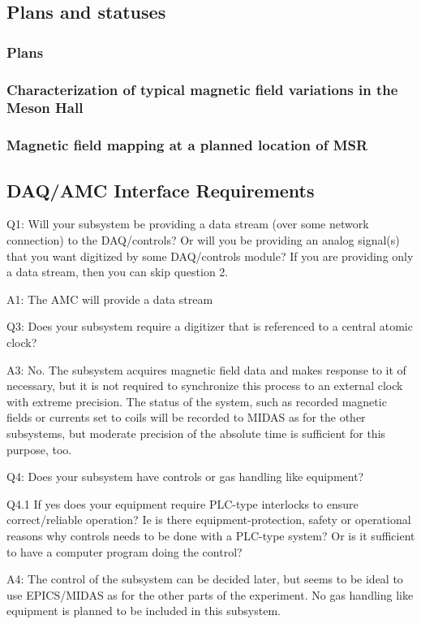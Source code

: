\subsection{Plans and statuses}
\subsubsection{Plans}
\subsubsection{Characterization of typical magnetic field variations in the Meson Hall}\label{sec:AMC-variation}
\subsubsection{Magnetic field mapping at a planned location of MSR}


\subsection{DAQ/AMC Interface Requirements}

Q1: Will your subsystem be providing a data stream (over some network connection) to the DAQ/controls?  Or will you be providing an analog signal(s) that you want digitized by some DAQ/controls module? 
If you are providing only a data stream, then you can skip question 2.

A1: The AMC will provide a data stream


Q3: Does your subsystem require a digitizer that is referenced to a central atomic clock?

A3: No. The subsystem acquires magnetic field data and makes response to it of necessary, but it is not required to synchronize this process to an external clock with extreme precision. The status of the system, such as recorded magnetic fields or currents set to coils will be recorded to MIDAS as for the other subsystems, but moderate precision of the absolute time is sufficient for this purpose, too.

Q4: Does your subsystem have controls or gas handling like equipment?


Q4.1 If yes does your equipment require PLC-type interlocks to ensure correct/reliable operation?  Ie is there equipment-protection, safety or operational reasons why controls needs to be done with a PLC-type system? Or is it sufficient to have a computer program doing the control?

A4: The control of the subsystem can be decided later, but seems to be ideal to use EPICS/MIDAS as for the other parts of the experiment. No gas handling like equipment is planned to be included in this  subsystem.

